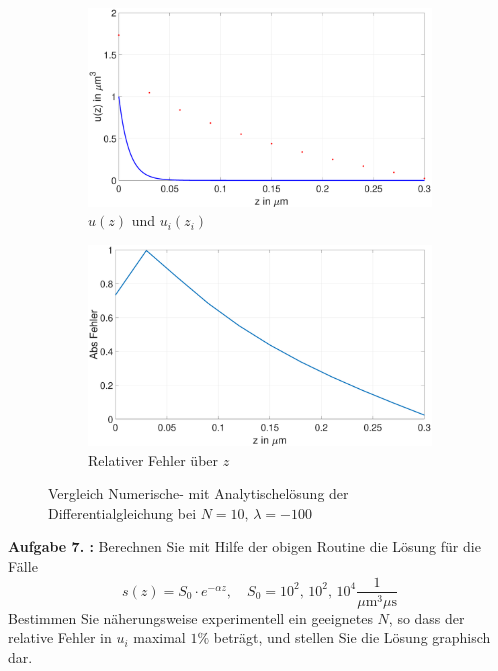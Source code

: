  \begin{figure}[]
 	\begin{subfigure}[b]{0.5\textwidth}
 		\includegraphics[width=\textwidth]{figures/station_gl_2_1/test_n10_l100}
 		\caption{$u(z)$ und $u_{i}(z_i)$}
 	\end{subfigure}
 	\hfill
 	\begin{subfigure}[b]{0.5\textwidth}
 		\includegraphics[width=1\linewidth]{figures/station_gl_2_1/test_n10_l100_fehler}
 		\caption{Relativer Fehler über $z$}
 	\end{subfigure}
 	\caption{Vergleich Numerische- mit Analytischelösung der Differentialgleichung bei $N=10,\,\lambda=-100$}
\end{figure}
\begin{figure}
	
\end{figure}
\clearpage
\begin{mybox}
	\textbf{Aufgabe 7. :}	Berechnen Sie mit Hilfe der obigen Routine die Lösung
	für die Fälle
	\begin{equation}
		s(z)=S_0\cdot e^{-\alpha z}, \quad S_0=10^2, \, 10^2, \, 10^4
		\frac{1}{\si{\mu\meter^3 \mu \s}}
	\end{equation}
	Bestimmen Sie näherungsweise experimentell ein geeignetes $N$, so dass der
	relative Fehler in $u_i$
	maximal $1\%$ beträgt, und stellen Sie die Lösung graphisch dar.
\end{mybox}

